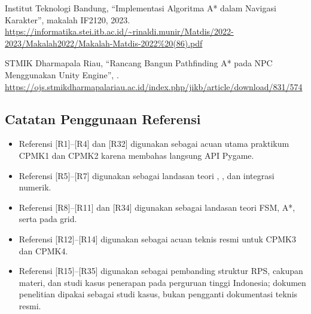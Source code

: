 \begin{sloppypar}
\begin{enumerate}[label={[R\arabic*]}, leftmargin=3.2em, itemsep=4pt, topsep=4pt, start=15]
  \item Institut Teknologi Bandung, ``Implementasi Algoritma A* dalam Navigasi
        Karakter'', makalah IF2120, 2023.
        \url{https://informatika.stei.itb.ac.id/~rinaldi.munir/Matdis/2022-2023/Makalah2022/Makalah-Matdis-2022%20(86).pdf}

  \item STMIK Dharmapala Riau, ``Rancang Bangun Pathfinding A* pada NPC
        Menggunakan Unity Engine'', .
        \url{https://ojs.stmikdharmapalariau.ac.id/index.php/jikb/article/download/831/574}
\end{enumerate}
\end{sloppypar}

\subsection{Catatan Penggunaan Referensi}

\begin{itemize}
  \item Referensi [R1]--[R4] dan [R32] digunakan sebagai acuan utama praktikum
        CPMK1 dan CPMK2 karena membahas langsung API Pygame.
  \item Referensi [R5]--[R7] digunakan sebagai landasan teori , , dan integrasi numerik.
  \item Referensi [R8]--[R11] dan [R34] digunakan sebagai landasan teori FSM,
        A*, serta  pada grid.
  \item Referensi [R12]--[R14] digunakan sebagai acuan teknis resmi untuk
        CPMK3 dan CPMK4.
  \item Referensi [R15]--[R35] digunakan sebagai pembanding struktur RPS,
        cakupan materi, dan studi kasus penerapan pada perguruan tinggi
        Indonesia; dokumen penelitian dipakai sebagai studi kasus, bukan
        pengganti dokumentasi teknis resmi.
\end{itemize}
